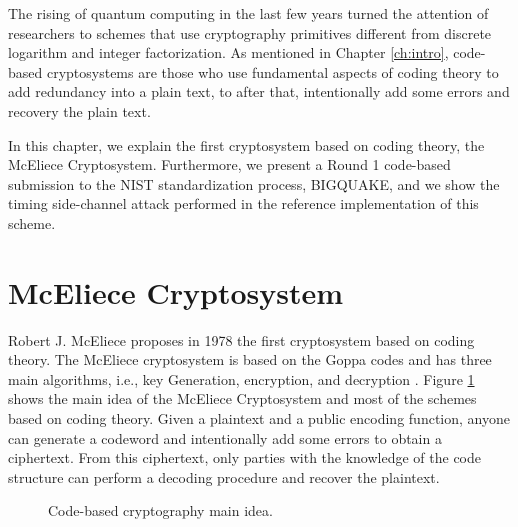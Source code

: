 The rising of quantum computing in the last few years turned the attention of researchers to schemes that use cryptography primitives different from discrete logarithm and integer factorization. As mentioned in Chapter \ref{ch:intro}, code-based cryptosystems are those who use fundamental aspects of coding theory to add redundancy into a plain text, to after that, intentionally add some errors and recovery the plain text. 

In this chapter, we explain the first cryptosystem based on coding theory, the McEliece Cryptosystem. Furthermore, we present a Round 1 code-based submission to the NIST standardization process, BIGQUAKE, and we show the timing side-channel attack performed in the reference implementation of this scheme.

\section{McEliece Cryptosystem}
Robert J. McEliece proposes in 1978 the first cryptosystem based on coding theory. The McEliece cryptosystem is based on the Goppa codes and has three main algorithms, i.e., key Generation, encryption, and decryption \cite{mceliece1978public}. Figure \ref{fig:code-idea} shows the main idea of the McEliece Cryptosystem and most of the schemes based on coding theory. Given a plaintext and a public encoding function, anyone can generate a codeword and intentionally add some errors to obtain a ciphertext. From this ciphertext, only parties with the knowledge of the code structure can perform a decoding procedure and recover the plaintext.


\begin{figure}
    \centering
    \caption{Code-based cryptography main idea.}
    \label{fig:code-idea}
\end{figure}


